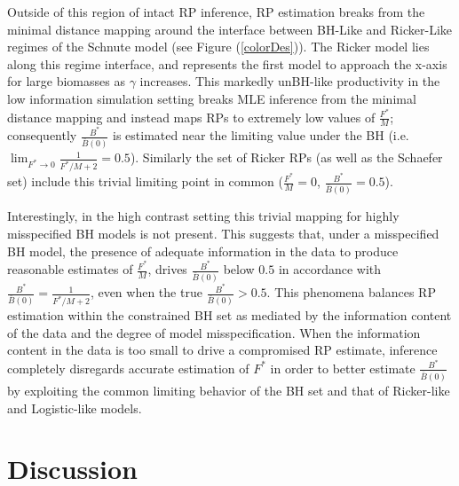 %
Outside of this region of intact RP inference, RP estimation breaks from the minimal 
distance mapping around the interface between BH-Like and Ricker-Like regimes 
of the Schnute model (see Figure (\ref{colorDes})). The Ricker model lies 
along this regime interface, and represents the first model to approach the 
x-axis for large biomasses as $\gamma$ increases. This markedly unBH-like 
productivity in the low information simulation setting breaks MLE inference 
from the minimal distance mapping and instead maps RPs to extremely low values 
of $\frac{F^*}{M}$; consequently $\frac{B^*}{\bar B(0)}$ is estimated near the 
limiting value under the BH (i.e. $\lim_{F^* \to 0}\frac{1}{F^*/M+2}=0.5$).
Similarly the set of Ricker RPs (as well as the Schaefer set) include this
trivial limiting point in common ($\frac{F^*}{M}=0$, $\frac{B^*}{\bar B(0)}=0.5$). 

%
Interestingly, in the high contrast setting this trivial mapping for highly
misspecified BH models is not present. This suggests that, under a
misspecified BH model, the presence of adequate information in the data to
produce reasonable estimates of $\frac{F^*}{M}$, drives $\frac{B^*}{\bar B(0)}$
below $0.5$ in accordance with $\frac{B^*}{\bar B(0)}=\frac{1}{F^*/M+2}$,
even when the true $\frac{B^*}{\bar B(0)}>0.5$.
This phenomena balances RP estimation within the constrained BH set as
mediated by the information content of the data and the degree of model
misspecification. When the information content in the data is too small to
drive a compromised RP estimate, inference completely disregards accurate
estimation of $F^*$ in order to better estimate $\frac{B^*}{\bar B(0)}$
by exploiting the common limiting behavior of the BH set and that of
Ricker-like and Logistic-like models.



\section{Discussion}

